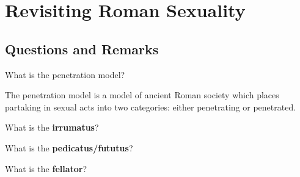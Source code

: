 %
%
%
\chapter{Revisiting Roman Sexuality}
\label{RevRomSex} %








\abstract{}

\section{Questions and Remarks}
\label{sec:QR4}

\begin{qst}
    What is the penetration model?
\end{qst}
The penetration model is a model of ancient Roman society which places partaking in sexual acts into two categories: either penetrating or penetrated.


\begin{qst}
    What is the \textbf{irrumatus}?
\end{qst}


\begin{qst}
    What is the \textbf{pedicatus/fututus}?
\end{qst}


\begin{qst}
    What is the \textbf{fellator}?
\end{qst}


